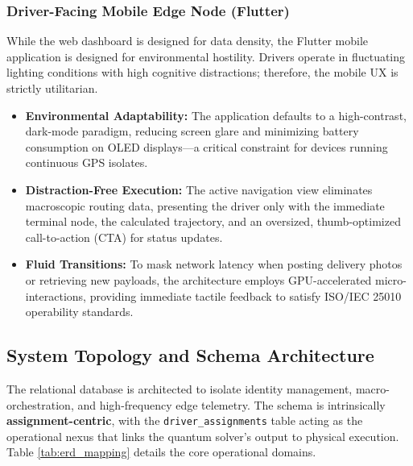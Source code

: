 \documentclass[a4paper]{report}
\begin{document}
{\begin{itemize}
\begin{itemize}
\subsubsection{Driver-Facing Mobile Edge Node (Flutter)}
While the web dashboard is designed for data density, the Flutter mobile application is designed for environmental hostility. Drivers operate in fluctuating lighting conditions with high cognitive distractions; therefore, the mobile UX is strictly utilitarian.

\begin{itemize}
    \item \textbf{Environmental Adaptability:} The application defaults to a high-contrast, dark-mode paradigm, reducing screen glare and minimizing battery consumption on OLED displays—a critical constraint for devices running continuous GPS isolates.
    \item \textbf{Distraction-Free Execution:} The active navigation view eliminates macroscopic routing data, presenting the driver only with the immediate terminal node, the calculated trajectory, and an oversized, thumb-optimized call-to-action (CTA) for status updates.
    \item \textbf{Fluid Transitions:} To mask network latency when posting delivery photos or retrieving new payloads, the architecture employs GPU-accelerated micro-interactions, providing immediate tactile feedback to satisfy ISO/IEC 25010 operability standards.
\end{itemize}

\subsection{System Topology and Schema Architecture}
\label{sec:schema-architecture}

The relational database is architected to isolate identity management, macro-orchestration, and high-frequency edge telemetry. The schema is intrinsically \textbf{assignment-centric}, with the \texttt{driver\_assignments} table acting as the operational nexus that links the quantum solver's output to physical execution. Table \ref{tab:erd_mapping} details the core operational domains.


\end{itemize}
\end{itemize}}
\end{document}
